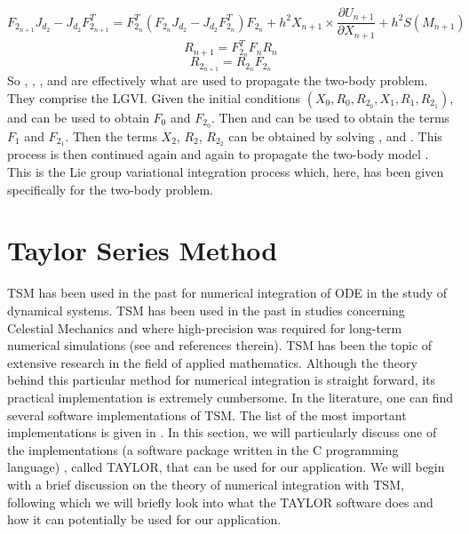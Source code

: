 \begin{equation}
\label{lgvi3}
F_{2_{n+1}} J_{d_2} - J_{d_2} F_{2_{n+1}}^T = F_{2_n}^T (F_{2_{n}} J_{d_2} - J_{d_2} F_{2_{n}}^T) F_{2_n} + h^2 X_{n+1} \times \frac{\partial U_{n+1}}{\partial X_{n+1}} + h^2 S(M_{n+1})
\end{equation}
%
\begin{equation}
\label{lgvi4}
R_{n+1} = F_{2_n}^T F_n R_n
\end{equation}
%
\begin{equation}
\label{lgvi5}
R_{2_{n+1}} = R_{2_n} F_{2_n}
\end{equation}
%
So , , ,  and  are effectively what are used to propagate the two-body problem. They comprise the \gls{LGVI}. Given the initial conditions $(X_0, R_0, R_{2_0}, X_1, R_1, R_{2_1})$,  and  can be used to obtain $F_0$ and $F_{2_0}$. Then  and  can be used to obtain the terms $F_1$ and $F_{2_1}$. Then the terms $X_2$, $R_2$, $R_{2_2}$ can be obtained by solving ,  and . This process is then continued again and again to propagate the two-body model \cite{lee_lgvi}. This is the Lie group variational integration process which, here, has been given specifically for the two-body problem.

\section{Taylor Series Method}
\gls{TSM} has been used in the past for numerical integration of \gls{ODE} in the study of dynamical systems. \gls{TSM} has been used in the past in studies concerning Celestial Mechanics and where high-precision was required for long-term numerical simulations (see \cite{tsm2011} and references therein). \gls{TSM} has been the topic of extensive research in the field of applied mathematics. Although the theory behind this particular method for numerical integration is straight forward, its practical implementation is extremely cumbersome. In the literature, one can find several software implementations of \gls{TSM}. The list of the most important implementations is given in \cite{tsm2011}. In this section, we will particularly discuss one of the implementations (a software package written in the C programming language) \cite{taylorSoftware}, called TAYLOR, that can be used for our application. We will begin with a brief discussion on the theory of numerical integration with \gls{TSM}, following which we will briefly look into what the TAYLOR software does and how it can potentially be used for our application.

